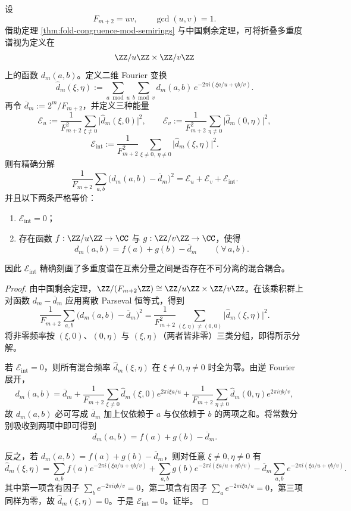 \begin{conclusion}\label{con:xi-time-part9l-crt-interaction-energy-additive-separation}
设
\[
F_{m+2}=uv,\qquad \gcd(u,v)=1.
\]
借助定理 \ref{thm:fold-congruence-mod-semirings} 与中国剩余定理，可将折叠多重度谱视为定义在
\[
\ZZ/u\ZZ\times \ZZ/v\ZZ
\]
上的函数 \(d_m(a,b)\)。定义二维 Fourier 变换
\[
\widehat d_m(\xi,\eta)
:=
\sum_{a\bmod u}\sum_{b\bmod v}
d_m(a,b)\,e^{-2\pi i(\xi a/u+\eta b/v)}.
\]
再令 \(\overline d_m:=2^m/F_{m+2}\)，并定义三种能量
\[
\mathcal E_u:=\frac{1}{F_{m+2}^2}\sum_{\xi\ne 0}\bigl|\widehat d_m(\xi,0)\bigr|^2,
\qquad
\mathcal E_v:=\frac{1}{F_{m+2}^2}\sum_{\eta\ne 0}\bigl|\widehat d_m(0,\eta)\bigr|^2,
\]
\[
\mathcal E_{\mathrm{int}}
:=
\frac{1}{F_{m+2}^2}\sum_{\xi\ne 0,\ \eta\ne 0}\bigl|\widehat d_m(\xi,\eta)\bigr|^2.
\]
则有精确分解
\[
\frac{1}{F_{m+2}}\sum_{a,b}\bigl(d_m(a,b)-\overline d_m\bigr)^2
=
\mathcal E_u+\mathcal E_v+\mathcal E_{\mathrm{int}}.
\]
并且以下两条严格等价：
\begin{enumerate}
  \item \(\mathcal E_{\mathrm{int}}=0\)；
  \item 存在函数 \(f:\ZZ/u\ZZ\to\CC\) 与 \(g:\ZZ/v\ZZ\to\CC\)，使得
  \[
  d_m(a,b)=f(a)+g(b)-\overline d_m
  \qquad
  (\forall\,a,b).
  \]
\end{enumerate}
因此 \(\mathcal E_{\mathrm{int}}\) 精确刻画了多重度谱在互素分量之间是否存在不可分离的混合耦合。
\end{conclusion}
\begin{proof}
由中国剩余定理，\(\ZZ/(F_{m+2}\ZZ)\cong \ZZ/u\ZZ\times \ZZ/v\ZZ\)。在该乘积群上对函数 \(d_m-\overline d_m\) 应用离散 Parseval 恒等式，得到
\[
\frac{1}{F_{m+2}}\sum_{a,b}\bigl(d_m(a,b)-\overline d_m\bigr)^2
=
\frac{1}{F_{m+2}^2}
\sum_{(\xi,\eta)\ne (0,0)}
\bigl|\widehat d_m(\xi,\eta)\bigr|^2.
\]
将非零频率按 \((\xi,0)\)、\((0,\eta)\) 与 \((\xi,\eta)\)（两者皆非零）三类分组，即得所示分解。

若 \(\mathcal E_{\mathrm{int}}=0\)，则所有混合频率 \(\widehat d_m(\xi,\eta)\) 在 \(\xi\ne 0,\eta\ne 0\) 时全为零。由逆 Fourier 展开，
\[
d_m(a,b)
=
\overline d_m
+
\frac{1}{F_{m+2}}\sum_{\xi\ne 0}\widehat d_m(\xi,0)e^{2\pi i\xi a/u}
+
\frac{1}{F_{m+2}}\sum_{\eta\ne 0}\widehat d_m(0,\eta)e^{2\pi i\eta b/v},
\]
故 \(d_m(a,b)\) 必可写成 \(\overline d_m\) 加上仅依赖于 \(a\) 与仅依赖于 \(b\) 的两项之和。将常数分别吸收到两项中即可得到
\[
d_m(a,b)=f(a)+g(b)-\overline d_m.
\]

反之，若 \(d_m(a,b)=f(a)+g(b)-\overline d_m\)，则对任意 \(\xi\ne 0,\eta\ne 0\) 有
\[
\widehat d_m(\xi,\eta)
=
\sum_{a,b}f(a)e^{-2\pi i(\xi a/u+\eta b/v)}
+
\sum_{a,b}g(b)e^{-2\pi i(\xi a/u+\eta b/v)}
-\overline d_m\sum_{a,b}e^{-2\pi i(\xi a/u+\eta b/v)}.
\]
其中第一项含有因子 \(\sum_b e^{-2\pi i\eta b/v}=0\)，第二项含有因子 \(\sum_a e^{-2\pi i\xi a/u}=0\)，第三项同样为零，故 \(\widehat d_m(\xi,\eta)=0\)。于是 \(\mathcal E_{\mathrm{int}}=0\)。证毕。
\end{proof}

